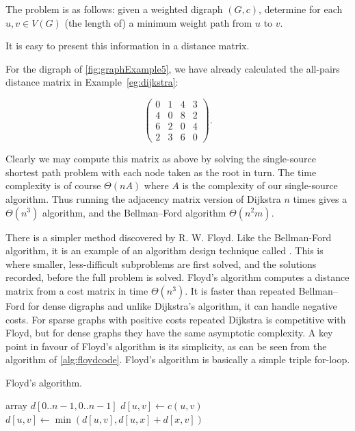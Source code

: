 The problem is as follows: given a weighted digraph $(G, c)$, determine
for each $u, v\in V(G)$ (the length of) a minimum weight path from $u$
to $v$.

It is easy to present this information in a distance matrix.

\begin{Example}
\label{eg:APSP}
For the digraph of \cref{fig:graphExample5}, we have already
calculated the all-pairs distance matrix in Example~\ref{eg:dijkstra}:

$$
\left(
\begin{matrix}
0 & 1 & 4 & 3 \\
4 & 0 & 8 & 2 \\
6 & 2 & 0 & 4 \\
2 & 3 & 6 & 0
\end{matrix}
\right).
$$
\end{Example}

Clearly we may compute this matrix as above by solving the single-source
shortest path problem with each node taken as the root in turn. The time
complexity is of course $\Theta(nA)$ where $A$ is the complexity of our
single-source algorithm. Thus running the adjacency matrix version of
Dijkstra $n$ times gives a $\Theta(n^3)$ algorithm, and the 
Bellman--Ford algorithm $\Theta(n^2 m)$.

There is a simpler method discovered by R. W. Floyd. Like the Bellman-Ford 
algorithm, it is an example of an algorithm design technique called 
.
This is where smaller, less-difficult subproblems are first solved, and the 
solutions recorded, before
the full problem is solved. Floyd's algorithm computes a distance matrix
from a cost matrix in time $\Theta(n^3)$. It is faster than repeated
Bellman--Ford for dense digraphs and unlike Dijkstra's algorithm,
it can handle negative costs. For sparse graphs with positive costs
repeated Dijkstra is competitive with Floyd, but for dense graphs they
have the same asymptotic complexity. A key point in favour of Floyd's
algorithm is its simplicity, as can be seen from the algorithm of
\cref{alg:floydcode}. Floyd's algorithm is basically a simple
triple for-loop.

\begin{algorithm}[H]
  \caption{Floyd's algorithm.}
  \label{alg:floydcode}
\begin{algorithmic}[1]
	\State array $d[0..n-1,0..n-1]$
			\State $d[u, v] \gets c(u, v)$
		\EndFor 
	\EndFor
				\State $d[u,v] \gets \min( d[u,v], d[u,x] + d[x,v] )$
			\EndFor
		\EndFor
	\EndFor
	\State {}
\EndFunction
\end{algorithmic}
\end{algorithm}


